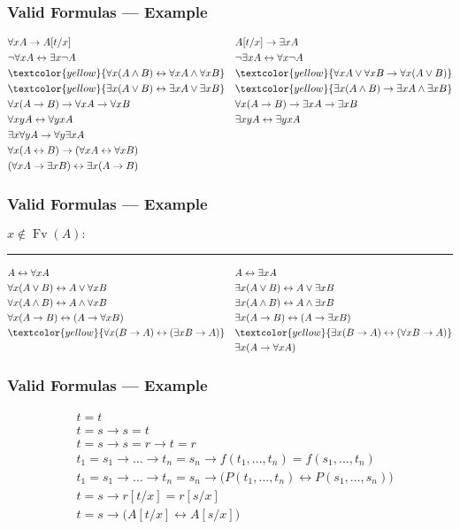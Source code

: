 \documentclass[UTF8,aspectratio=43,11pt,colorlinks,compress,openany]{beamer}%
\begin{document}
\begin{frame}\frametitle{Valid Formulas --- Example}
	\begin{align*}
	&\forall x A\to A[t/x] && A[t/x]\to\exists x A\\
	&\neg\forall x A\leftrightarrow\exists x\neg A &&\neg\exists x A\leftrightarrow\forall x\neg A\\
	&\textcolor{yellow}{\forall x(A\wedge B)\leftrightarrow\forall x A\wedge\forall x B} &&\textcolor{yellow}{\forall x A\vee\forall x B\to\forall x(A\vee B)}\\
	&\textcolor{yellow}{\exists x(A\vee B)\leftrightarrow\exists x A\vee\exists x B} &&\textcolor{yellow}{\exists x(A\wedge B)\to\exists x A\wedge\exists x B}\\
	&\forall x(A\to B)\to\forall x A\to\forall x B &&\forall x(A\to B)\to\exists x A\to\exists x B\\
	&\forall xy A\leftrightarrow\forall yx A &&\exists xy A\leftrightarrow\exists yx A\\
	&\exists x\forall y A\to\forall y\exists x A &&\\
	&\forall x(A\leftrightarrow B)\to(\forall x A\leftrightarrow\forall x B) &&\\
	&(\forall x A\to\exists x B)\leftrightarrow\exists x(A\to B)&&
	\end{align*}
\end{frame}

\begin{frame}\frametitle{Valid Formulas --- Example}
	$x\notin \operatorname{Fv}(A):$
	\hrule
	\begin{align*}
	& A\leftrightarrow\forall x A && A\leftrightarrow\exists x A\\
	&\forall x(A\vee B)\leftrightarrow A\vee\forall x B &&\exists x(A\vee B)\leftrightarrow A\vee\exists x B\\
	&\forall x(A\wedge B)\leftrightarrow A\wedge\forall x B &&\exists x(A\wedge B)\leftrightarrow A\wedge\exists x B\\
	&\forall x(A\to B)\leftrightarrow(A\to\forall x B) &&\exists x(A\to B)\leftrightarrow(A\to\exists x B)\\
	&\textcolor{yellow}{\forall x(B\to A)\leftrightarrow(\exists x B\to A)} &&\textcolor{yellow}{\exists x(B\to A)\leftrightarrow(\forall x B\to A)}\\
	&&&\exists x(A\to\forall x A)
	\end{align*}
\end{frame}

\begin{frame}\frametitle{Valid Formulas --- Example}
	\begin{align*}
	&t=t\\
	&t=s\to s=t\\
	&t=s\to s=r\to t=r\\
	&t_1=s_1\to\dots\to t_n=s_n\to f(t_1,\dots,t_n)=f(s_1,\dots,t_n)\\
	&t_1=s_1\to\dots\to t_n=s_n\to \bigl(P(t_1,\dots,t_n)\leftrightarrow P(s_1,\dots,s_n)\bigr)\\
	&t=s\to r[t/x]=r[s/x]\\
	&t=s\to\bigl(A[t/x]\leftrightarrow A[s/x]\bigr)
	\end{align*}
\end{frame}
\end{document}
